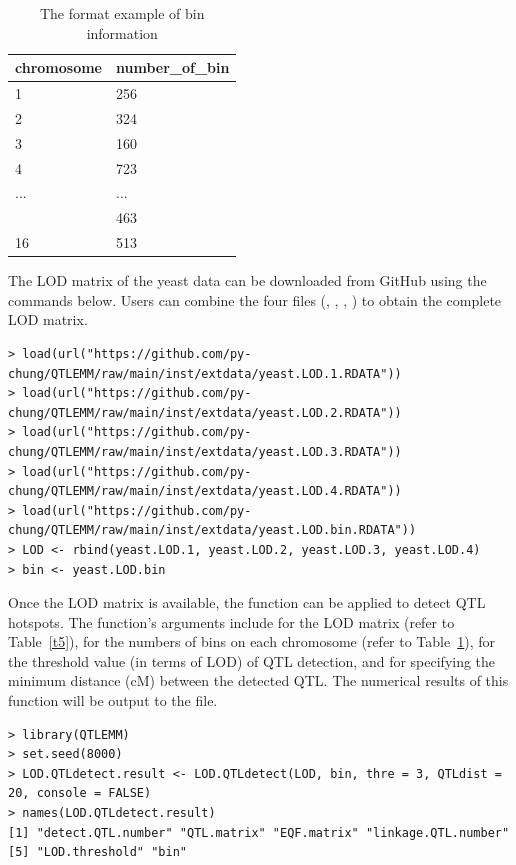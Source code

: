 \begin{table}
	\centering
	\caption{The format example of bin information}
	\label{t6}
	\centering
	\begin{tabular}[t]{ll}

		chromosome & number\_of\_bin\\
		\toprule
		1 & 256\\
		2 & 324\\
		3 & 160\\
		4 & 723\\
		... & ...\\
		\addlinespace
		15 & 463\\
		16 & 513\\
		\bottomrule
	\end{tabular}
\end{table}

The LOD matrix of the yeast data can be downloaded from GitHub using the commands below. Users can combine the four files (, , , ) to obtain the complete LOD matrix.

\begin{verbatim}
> load(url("https://github.com/py-chung/QTLEMM/raw/main/inst/extdata/yeast.LOD.1.RDATA"))
> load(url("https://github.com/py-chung/QTLEMM/raw/main/inst/extdata/yeast.LOD.2.RDATA"))
> load(url("https://github.com/py-chung/QTLEMM/raw/main/inst/extdata/yeast.LOD.3.RDATA"))
> load(url("https://github.com/py-chung/QTLEMM/raw/main/inst/extdata/yeast.LOD.4.RDATA"))
> load(url("https://github.com/py-chung/QTLEMM/raw/main/inst/extdata/yeast.LOD.bin.RDATA"))
> LOD <- rbind(yeast.LOD.1, yeast.LOD.2, yeast.LOD.3, yeast.LOD.4)
> bin <- yeast.LOD.bin
\end{verbatim}

\noindent Once the LOD matrix is available, the  function can be applied to detect QTL hotspots. The function's arguments include  for the LOD matrix (refer to Table~\ref{t5}),  for the numbers of bins on each chromosome (refer to Table~\ref{t6}),  for the threshold value (in terms of LOD) of QTL detection, and  for specifying the minimum distance (cM) between the detected QTL. The numerical results of this function will be output to the  file.

\begin{verbatim}
> library(QTLEMM)
> set.seed(8000)
> LOD.QTLdetect.result <- LOD.QTLdetect(LOD, bin, thre = 3, QTLdist = 20, console = FALSE)
> names(LOD.QTLdetect.result)
[1] "detect.QTL.number" "QTL.matrix" "EQF.matrix" "linkage.QTL.number"
[5] "LOD.threshold" "bin"
\end{verbatim}


